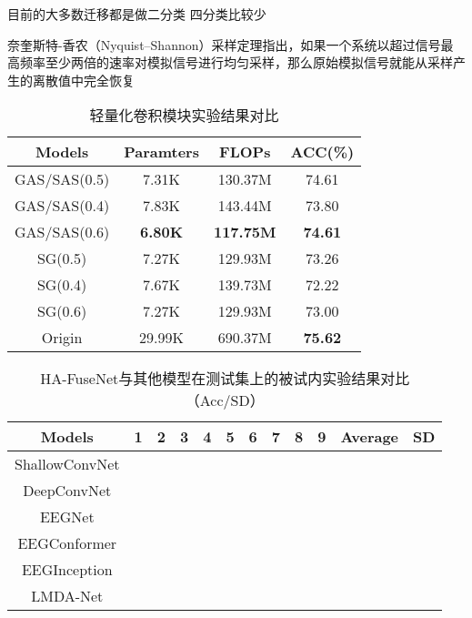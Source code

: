 目前的大多数迁移都是做二分类 四分类比较少

奈奎斯特-香农（Nyquist–Shannon）采样定理指出，如果一个系统以超过信号最高频率至少两倍的速率对模拟信号进行均匀采样，那么原始模拟信号就能从采样产生的离散值中完全恢复


\begin{table}[ht]
  \centering
  \caption{轻量化卷积模块实验结果对比}
  \label{tab:lite}
  \begin{tabularx}{\textwidth}{CCCC}
    \toprule
    Models & Paramters & FLOPs & ACC(\%) \\
    \midrule
    GAS/SAS(0.5) & 7.31K & 130.37M & 74.61\\
    GAS/SAS(0.4) & 7.83K & 143.44M & 73.80\\
    GAS/SAS(0.6) & \textbf{6.80K} & \textbf{117.75M} & \textbf{74.61}\\
    SG(0.5) & 7.27K & 129.93M & 73.26\\
    SG(0.4) & 7.67K & 139.73M & 72.22\\
    SG(0.6) & 7.27K & 129.93M & 73.00\\
    Origin & 29.99K & 690.37M & \textbf{75.62}\\
    \bottomrule
  \end{tabularx}
\end{table}

\begin{sidewaystable}[ht]
	\caption{HA-FuseNet与其他模型在测试集上的被试内实验结果对比（Acc/SD）}
	\centering
    \label{tab:2acomparein1}
	\begin{tabularx}{\textwidth}{CCCCCCCCCCCC}
        \toprule
        Models & 1 & 2 & 3 & 4 & 5 & 6 & 7 & 8 & 9 & Average & SD \\
        \midrule
        ShallowConvNet \\
        DeepConvNet \\
        EEGNet \\
        EEGConformer \\
        EEGInception \\
        LMDA-Net \\
        \bottomrule
	\end{tabularx}
\end{sidewaystable}


